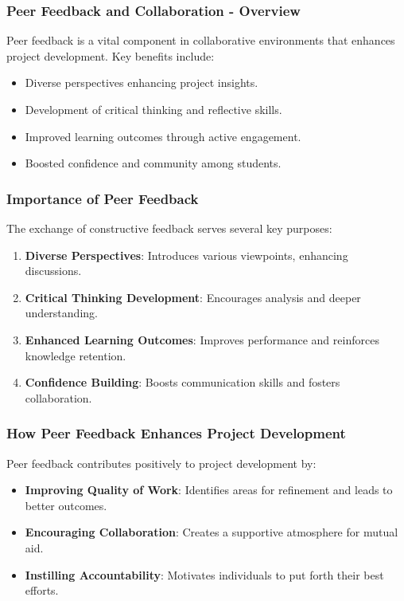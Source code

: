 \documentclass[aspectratio=169]{beamer}
\begin{document}
\begin{frame}[fragile]
    \frametitle{Peer Feedback and Collaboration - Overview}
    Peer feedback is a vital component in collaborative environments that enhances project development. Key benefits include:
    \begin{itemize}
        \item Diverse perspectives enhancing project insights.
        \item Development of critical thinking and reflective skills.
        \item Improved learning outcomes through active engagement.
        \item Boosted confidence and community among students.
    \end{itemize}
\end{frame}

\begin{frame}[fragile]
    \frametitle{Importance of Peer Feedback}
    The exchange of constructive feedback serves several key purposes:
    \begin{enumerate}
        \item \textbf{Diverse Perspectives}: Introduces various viewpoints, enhancing discussions.
        \item \textbf{Critical Thinking Development}: Encourages analysis and deeper understanding.
        \item \textbf{Enhanced Learning Outcomes}: Improves performance and reinforces knowledge retention.
        \item \textbf{Confidence Building}: Boosts communication skills and fosters collaboration.
    \end{enumerate}
\end{frame}

\begin{frame}[fragile]
    \frametitle{How Peer Feedback Enhances Project Development}
    Peer feedback contributes positively to project development by:
    \begin{itemize}
        \item \textbf{Improving Quality of Work}: Identifies areas for refinement and leads to better outcomes.
        \item \textbf{Encouraging Collaboration}: Creates a supportive atmosphere for mutual aid.
        \item \textbf{Instilling Accountability}: Motivates individuals to put forth their best efforts.
    \end{itemize}
\end{frame}
\end{document}
